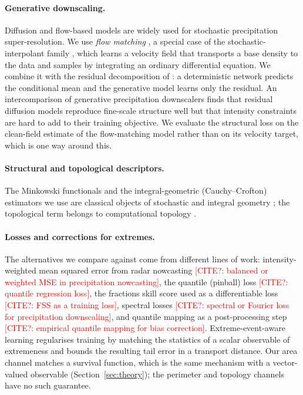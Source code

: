 \documentclass{article}
\newcommand{\citeneeded}[1]{\textcolor{red}{[CITE?: #1]}}
\begin{document}
\paragraph{Generative downscaling.} Diffusion and flow-based models are widely used for stochastic precipitation
super-resolution. We use \emph{flow matching} \citep{lipman2023flowmatching, liu2023rectifiedflow}, a special case of
the stochastic-interpolant family \citep{albergo2023stochastic}, which learns a velocity field that transports a base
density to the data and samples by integrating an ordinary differential equation. We combine it with the residual
decomposition of \citet{mardani2025corrdiff}: a deterministic network predicts the conditional mean and the
generative model learns only the residual. An intercomparison of generative precipitation downscalers
\citep{wardleikis2025intercomparison} finds that residual diffusion models reproduce fine-scale structure well but that
intensity constraints are hard to add to their training objective. We evaluate the structural loss on the clean-field
estimate of the flow-matching model rather than on its velocity target, which is one way around this.

\paragraph{Structural and topological descriptors.} The Minkowski functionals and the integral-geometric
(Cauchy--Crofton) estimators we use are classical objects of stochastic and integral geometry
\citep{schneider2008stochastic}; the topological term belongs to computational topology
\citep{edelsbrunner2010computational}.

\paragraph{Losses and corrections for extremes.} The alternatives we compare against come from different lines of
work: intensity-weighted mean squared error from radar nowcasting \citeneeded{balanced or weighted MSE in
precipitation nowcasting}, the quantile (pinball) loss \citeneeded{quantile regression loss}, the fractions skill
score \citep{roberts2008fss} used as a differentiable loss \citeneeded{FSS as a training loss}, spectral losses
\citeneeded{spectral or Fourier loss for precipitation downscaling}, and quantile mapping as a post-processing step
\citeneeded{empirical quantile mapping for bias correction}. Extreme-event-aware learning \citep{chang2026eta}
regularises training by matching the statistics of a scalar observable of extremeness and bounds the resulting
tail error in a transport distance. Our area channel matches a survival function, which is the same mechanism with a
vector-valued observable (Section~\ref{sec:theory}); the perimeter and topology channels have no such guarantee.
\end{document}
